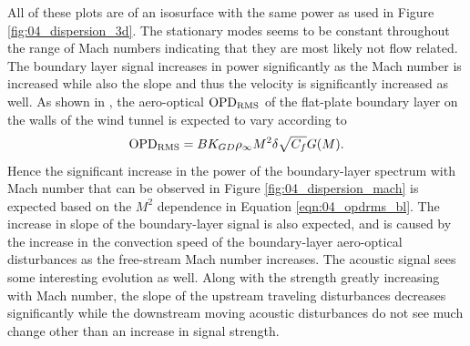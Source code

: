 All of these plots are of an isosurface with the same power as used in Figure \ref{fig:04_dispersion_3d}.
The stationary modes seems to be constant throughout the range of Mach numbers indicating that they are most likely not flow related.
The boundary layer signal increases in power significantly as the Mach number is increased while also the slope and thus the velocity is significantly increased as well.
As shown in \cite{Gordeyev-2014-jcJndkHM}, the aero-optical $\operatorname{OPD_{RMS}}$ of the flat-plate boundary layer on the walls of the wind tunnel is expected to vary according to
\begin{equation}
  \operatorname{OPD_{RMS}} = BK_{GD}\rho_\infty M^2\delta\sqrt{C_f}G(M) \textrm{.}
  \label{eqn:04_opdrms_bl}
\end{equation}
Hence the significant increase in the power of the boundary-layer spectrum with Mach number that can be observed in Figure \ref{fig:04_dispersion_mach} is expected based on the $M^2$ dependence in Equation \ref{eqn:04_opdrms_bl}.
The increase in slope of the boundary-layer signal is also expected, and is caused by the increase in the convection speed of the boundary-layer aero-optical disturbances as the free-stream Mach number increases.
The acoustic signal sees some interesting evolution as well.
Along with the strength greatly increasing with Mach number, the slope of the upstream traveling disturbances decreases significantly while the downstream moving acoustic disturbances do not see much change other than an increase in signal strength.

